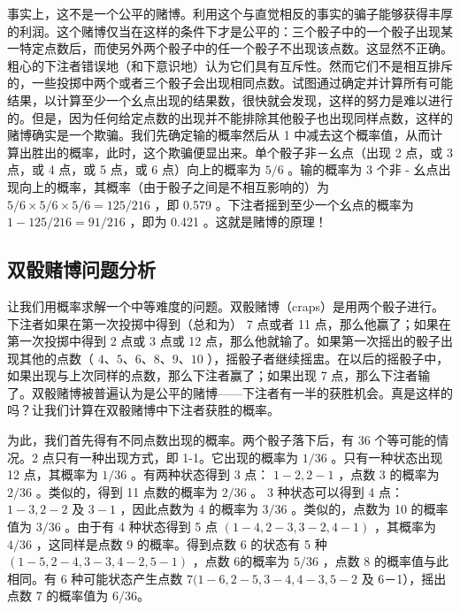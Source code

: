 事实上，这不是一个公平的赌博。利用这个与直觉相反的事实的骗子能够获得丰厚的利润。这个赌博仅当在这样的条件下才是公平的：三个骰子中的一个骰子出现某一特定点数后，而使另外两个骰子中的任一个骰子不出现该点数。这显然不正确。粗心的下注者错误地（和下意识地）认为它们具有互斥性。然而它们不是相互排斥的，一些投掷中两个或者三个骰子会出现相同点数。试图通过确定并计算所有可能结果，以计算至少一个幺点出现的结果数，很快就会发现，这样的努力是难以进行的。但是，因为任何给定点数的出现并不能排除其他骰子也出现同样点数，这样的赌博确实是一个欺骗。我们先确定输的概率然后从 1 中减去这个概率值，从而计算出胜出的概率，此时，这个欺骗便显出来。单个骰子非－幺点（出现 2 点，或 3 点，或 4 点，或 5 点，或 6 点）向上的概率为 $5 / 6$ 。输的概率为 3 个非 - 幺点出现向上的概率，其概率（由于骰子之间是不相互影响的）为 $5 / 6 \times 5 / 6 \times 5 / 6=125 / 216$ ，即 0.579 。下注者摇到至少一个幺点的概率为 $1-125 / 216=91 / 216$ ，即为 0.421 。这就是赌博的原理！

\subsection{双骰赌博问题分析}

让我们用概率求解一个中等难度的问题。双骰赌博（craps）是用两个骰子进行。下注者如果在第一次投掷中得到（总和为） 7 点或者 11 点，那么他赢了；如果在第一次投掷中得到 2 点或 3 点或 12 点，那么他就输了。如果第一次摇出的骰子出现其他的点数（ $4$、$5$、$6$、$8$、$9$、$10$ ），摇骰子者继续摇盅。在以后的摇骰子中，如果出现与上次同样的点数，那么下注者赢了；如果出现 7 点，那么下注者输了。双骰赌博被普遍认为是公平的赌博——下注者有一半的获胜机会。真是这样的吗？让我们计算在双骰赌博中下注者获胜的概率。

为此，我们首先得有不同点数出现的概率。两个骰子落下后，有 36 个等可能的情况。2 点只有一种出现方式，即 1-1。它出现的概率为 $1 / 36$ 。只有一种状态出现 12 点，其概率为 $1 / 36$ 。有两种状态得到 3 点： $1-2,2-1$ ，点数 3 的概率为 $2 / 36$ 。类似的，得到 11 点数的概率为 $2 / 36$ 。 3 种状态可以得到 4 点： $1-3,2-2$ 及 $3-1$ ，因此点数为 4 的概率为 $3 / 36$ 。类似的，点数为 10 的概率值为 $3 / 36$ 。由于有 4 种状态得到 5 点 $(1-4,2-3,3-2,4-1)$ ，其概率为 $4 / 36$ ，这同样是点数 9 的概率。得到点数 6 的状态有 5 种 $(1-5,2-4,3-3,4-2,5-1)$ ，点数 6的概率为 $5 / 36$ ，点数 8 的概率值与此相同。有 6 种可能状态产生点数 $7(1-6,2-5,3-4,4-3,5-2$ 及 6－1），摇出点数 7 的概率值为 $6 / 36$。

